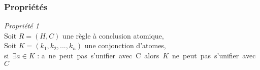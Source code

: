 
\subsubsection{Propri\'et\'es}\label{unification_correction_proprietes}
	
	{\em Propri\'et\'e 1} \\
	Soit $R = (H,C)$ une r\`egle \`a conclusion atomique, \\
	Soit $K = (k_1, k_2, ..., k_n)$ une conjonction d'atomes,\\
	si\ $\exists a \in K$ : a\ ne\ peut\ pas\ s'unifier\ avec\ C\ alors\ $K$\ ne\ peut\ pas\ s'unifier\ avec\ $C$

